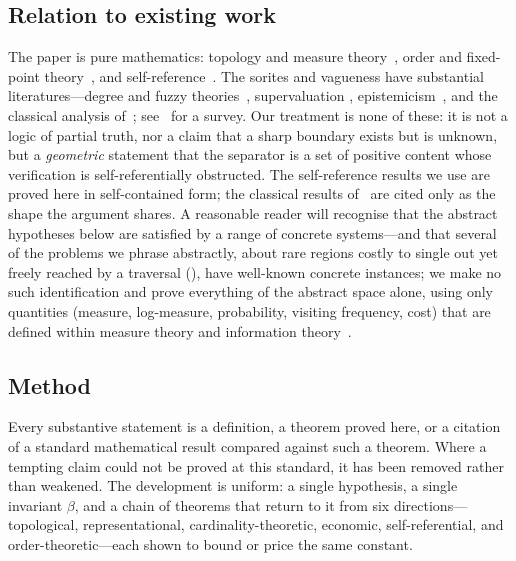\documentclass[11pt,twocolumn,a4paper]{article}
\theoremstyle{thmstyle}
\theoremstyle{definition}
\theoremstyle{remark}
\newcommand{\thick}{\beta}
\begin{document}
\subsection{Relation to existing work}

The paper is pure mathematics: topology and measure theory~\citep{kelley1955,%
munkres2000,halmos1950,federer1969,mattila1995,engelking1995,hurewicz1941},
order and fixed-point theory~\citep{birkhoff1967,daveypriestley2002,%
tarski1955}, and self-reference~\citep{russell1903,cantor1891,tarski1936,%
godel1931,lawvere1969}. The sorites and vagueness have substantial
literatures---degree and fuzzy theories~\citep{zadeh1965}, supervaluation
\citep{fine1975,keefe2000}, epistemicism~\citep{williamson1994}, and the
classical analysis of~\citet{black1937}; see~\citet{hyderaffman2018} for a
survey. Our treatment is none of these: it is not a logic of partial truth,
nor a claim that a sharp boundary exists but is unknown, but a
\emph{geometric} statement that the separator is a set of positive content
whose verification is self-referentially obstructed. The self-reference
results we use are proved here in self-contained form; the classical results
of~\citet{russell1903,cantor1891,tarski1936} are cited only as the shape the
argument shares. A reasonable reader will recognise that the abstract
hypotheses below are satisfied by a range of concrete systems---and that several
of the problems we phrase abstractly, about rare regions costly to single out yet
freely reached by a traversal (), have well-known concrete
instances; we make no such identification and prove everything of the abstract
space alone, using only quantities (measure, log-measure, probability, visiting
frequency, cost) that are defined within measure theory and information
theory~\citep{shannon1948,cover2006}.

\subsection{Method}

Every substantive statement is a definition, a theorem proved here, or a
citation of a standard mathematical result compared against such a theorem.
Where a tempting claim could not be proved at this standard, it has been
removed rather than weakened. The development is uniform: a single hypothesis,
a single invariant $\thick$, and a chain of theorems that return to it from
six directions---topological, representational, cardinality-theoretic,
economic, self-referential, and order-theoretic---each shown to bound or price
the same constant.
\end{document}
